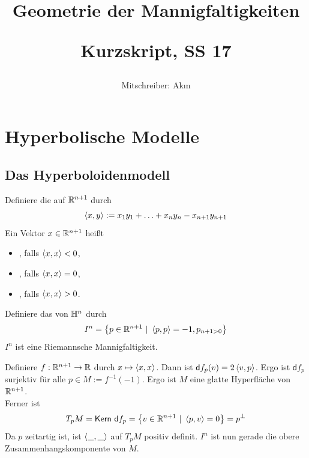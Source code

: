 \documentclass{book}
\renewcommand{\d}{\textsf{d}}
\begin{document}
\title{
\begin{huge}
Geometrie der Mannigfaltigkeiten\\
\end{huge}
\begin{large}
Kurzskript, SS 17
\end{large}}


\author{Mitschreiber: Ak\i n}
\maketitle
\renewcommand{\i}{^{-1}}


\setcounter{tocdepth}{1}
\tableofcontents

\newpage
\chapter{Hyperbolische Modelle}
\section{Das Hyperboloidenmodell}
\Def{}
Definiere die  auf $\mathbb{R}^{n+1}$ durch
\[ \left<x,y\right> := x_1y_1 + \ldots + x_{n}y_n - x_{n+1} y_{n+1} \]
Ein Vektor $x \in \mathbb{R}^{n+1}$ heißt
\begin{itemize}
	\item {}, falls $\left<x,x\right> < 0$,
	\item {}, falls $\left<x,x\right> = 0$,
	\item {}, falls $\left<x,x\right> > 0$.
\end{itemize}
Definiere das  von $\mathbb{H}^n$ durch
\[ I^n = \set{p \in \R^{n+1}}{\shrp{p,p} = -1, p_{n+1 > 0}} \]
\Prop{}
$I^n$ ist eine Riemannsche Mannigfaltigkeit.
\begin{Beweis}{}
Definiere $f : \mathbb{R}^{n+1} \overset{}{\rightarrow} \mathbb{R}$ durch $x \mapsto \left<x,x\right>$. Dann ist $\d f_p(v) = 2\shrp{v,p}$. Ergo ist $\d f_p$ surjektiv für alle $p \in M :=f\i(-1)$. Ergo ist $M$ eine glatte Hyperfläche von $\mathbb{R}^{n+1}$.\\
Ferner ist
\[ T_pM = \Ker ~\d f_p  = \set{v \in \R^{n+1}}{\shrp{p,v} = 0} = p^\bot \]
Da $p$ zeitartig ist, ist $\left<\_, \_\right>$ auf $T_pM$ positiv definit. $I^n$ ist nun gerade die obere Zusammenhangskomponente von $M$.
\end{Beweis}
\end{document}
